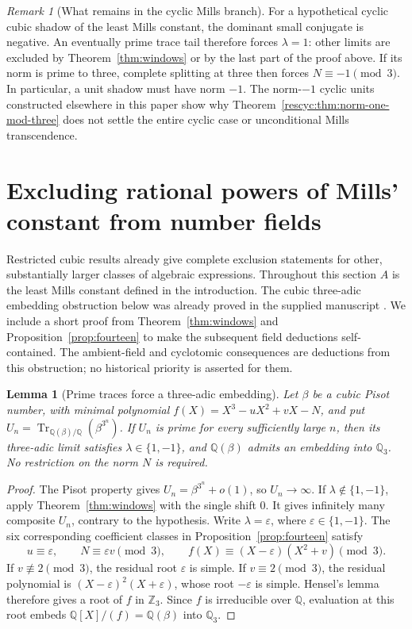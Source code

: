 \documentclass[11pt,a4paper]{article}
\newtheorem{lemma}[theorem]{Lemma}
\theoremstyle{remark}\newtheorem{remark}[theorem]{Remark}
\newcommand{\Z}{\mathbb Z}\newcommand{\Q}{\mathbb Q}
\newcommand{\Tr}{\operatorname{Tr}}\newcommand{\Nm}{\operatorname{N}}
\begin{document}
\begin{remark}[What remains in the cyclic Mills branch]
For a hypothetical cyclic cubic shadow of the least Mills
constant, the dominant small conjugate is negative. An eventually
prime trace tail therefore forces $\lambda=1$: other limits are
excluded by Theorem~\ref{thm:windows} or by the last part of the
proof above. If its norm is prime to three, complete splitting at
three then forces $N\equiv-1\pmod3$. In particular, a unit
shadow must have norm $-1$. The norm-$-1$ cyclic units constructed
elsewhere in this paper show why Theorem~\ref{rescyc:thm:norm-one-mod-three}
does not settle the entire cyclic case or unconditional Mills
transcendence.
\end{remark}


\section{Excluding rational powers of Mills' constant from number fields}
\label{res:sec:fields}

Restricted cubic results already give complete exclusion statements for
other, substantially larger classes of algebraic expressions. Throughout
this section $A$ is the least Mills constant defined in the introduction.
The cubic three-adic embedding obstruction below was already proved in
the supplied manuscript \cite{Keio031}. We include a short proof from
Theorem~\ref{thm:windows} and Proposition~\ref{prop:fourteen} to make the
subsequent field deductions self-contained. The ambient-field and
cyclotomic consequences are deductions from this obstruction; no
historical priority is asserted for them.

\begin{lemma}[Prime traces force a three-adic embedding]
\label{res:lem:prime-embedding}
Let $\beta$ be a cubic Pisot number, with minimal polynomial
$f(X)=X^3-uX^2+vX-N$, and put
$U_n=\Tr_{\Q(\beta)/\Q}(\beta^{3^n})$.
If $U_n$ is prime for every sufficiently large $n$, then its three-adic
limit satisfies $\lambda\in\{1,-1\}$, and $\Q(\beta)$ admits an
embedding into $\Q_3$. No restriction on the norm $N$ is required.
\end{lemma}
\begin{proof}
The Pisot property gives $U_n=\beta^{3^n}+o(1)$, so $U_n\to\infty$.
If $\lambda\notin\{1,-1\}$, apply Theorem~\ref{thm:windows} with the
single shift $0$. It gives infinitely many composite $U_n$, contrary
to the hypothesis. Write $\lambda=\varepsilon$, where
$\varepsilon\in\{1,-1\}$. The six corresponding coefficient classes
in Proposition~\ref{prop:fourteen} satisfy
\[
 u\equiv\varepsilon,\qquad N\equiv\varepsilon v\pmod3,
 \qquad
 f(X)\equiv(X-\varepsilon)(X^2+v)\pmod3.
\]
If $v\not\equiv2\pmod3$, the residual root $\varepsilon$ is simple.
If $v\equiv2\pmod3$, the residual polynomial is
$(X-\varepsilon)^2(X+\varepsilon)$, whose root $-\varepsilon$ is simple.
Hensel's lemma therefore gives a root of $f$ in $\Z_3$. Since $f$ is
irreducible over $\Q$, evaluation at this root embeds
$\Q[X]/(f)=\Q(\beta)$ into $\Q_3$.
\end{proof}
\end{document}
